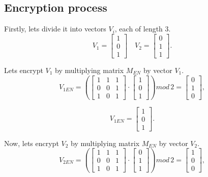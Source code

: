 \documentclass{article}
\begin{document}
    \subsection{Encryption process}
        Firstly, lets divide it into vectors $V_i$, each of length $3$.
        \vspace{1mm}
        $$V_1=\begin{bmatrix}
        1  \\
        0  \\
        1  
        \end{bmatrix} \quad
        V_2=\begin{bmatrix}
        0  \\
        1  \\
        1  
        \end{bmatrix}.$$
    
        Lets encrypt $V_1$ by multiplying matrix $M_{EN}$ by vector $V_1$.
        $$
        V_{1EN}=
        \left(
        \begin{bmatrix}
        1 & 1 & 1 \\
        0 & 0 & 1 \\
        1 & 0 & 1
        \end{bmatrix} \cdot
        \begin{bmatrix}
        1  \\
        0  \\
        1  
        \end{bmatrix}
        \right)
        mod \, 2
        =
        \begin{bmatrix}
        0  \\
        1  \\
        0  
        \end{bmatrix},
        $$
        
        $$
        V_{1EN}=\begin{bmatrix}
        1  \\
        0  \\
        1  
        \end{bmatrix}.$$
        \vspace{5mm}
        
        Now, lets encrypt $V_2$ by multiplying matrix $M_{EN}$ by vector $V_2$.
        $$
        V_{2EN}=
        \left(
        \begin{bmatrix}
        1 & 1 & 1 \\
        0 & 0 & 1 \\
        1 & 0 & 1
        \end{bmatrix} \cdot
        \begin{bmatrix}
        0  \\
        1  \\
        1  
        \end{bmatrix}
        \right)
        mod \, 2
        =
        \begin{bmatrix}
        1  \\
        0  \\
        0  
        \end{bmatrix},
        $$
        
\end{document}
